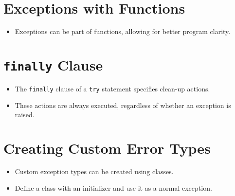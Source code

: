 \documentclass{article}
\begin{document}
\section{Exceptions with Functions}
\begin{itemize}
    \item Exceptions can be part of functions, allowing for better program clarity.
\end{itemize}

\section{\texttt{finally} Clause}
\begin{itemize}
    \item The \texttt{finally} clause of a \texttt{try} statement specifies clean-up actions.
    \item These actions are always executed, regardless of whether an exception is raised.
\end{itemize}

\section{Creating Custom Error Types}
\begin{itemize}
    \item Custom exception types can be created using classes.
    \item Define a class with an initializer and use it as a normal exception.
\end{itemize}
\end{document}
